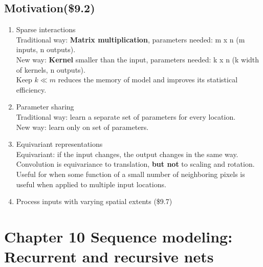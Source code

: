\documentclass[12pt]{article}
\numberwithin{equation}{section}
\begin{document}
\subsection{Motivation(\$9.2)}
\begin{enumerate}
	\item Sparse interactions \\
	Traditional way: \textbf{Matrix multiplication}, parameters needed: m x n (m inputs, n outputs). \\
	New way: \textbf{Kernel} smaller than the input, parameters needed: k x n (k width of kernels, n outputs).  \\
	Keep $k \ll m$ reduces the memory of model and improves its statistical efficiency. 
	\item Parameter sharing \\
	Traditional way: learn a separate set of parameters for every location. \\
	New way: learn only on set of parameters. 
	\item Equivariant representations \\
	Equivariant: if the input changes, the output changes in the same way. \\
	Convolution is equivariance to translation, \textbf{but not} to scaling and rotation. \\
	Useful for when some function of a small number of neighboring pixels is useful when applied to multiple input locations.
	\item Process inputs with varying spatial extents (\$9.7) 
\end{enumerate}
\section{Chapter 10 Sequence modeling: Recurrent and recursive nets}
\end{document}
